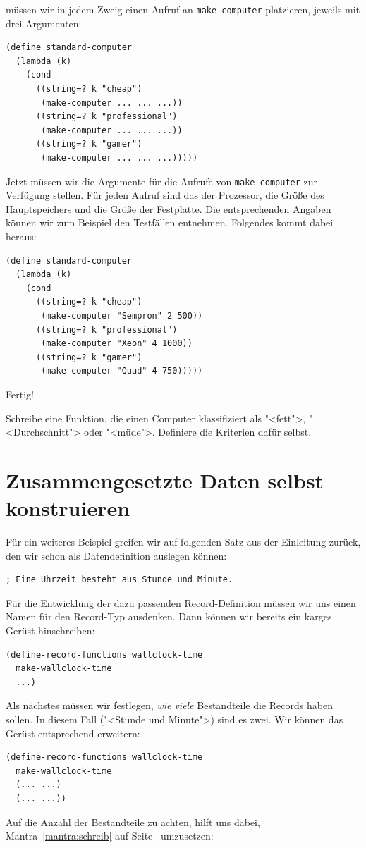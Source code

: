 müssen wir in jedem Zweig einen Aufruf an \texttt{make-computer}
platzieren, jeweils mit drei Argumenten:
%
\begin{verbatim}
(define standard-computer
  (lambda (k)
    (cond
      ((string=? k "cheap")
       (make-computer ... ... ...))
      ((string=? k "professional")
       (make-computer ... ... ...))
      ((string=? k "gamer")
       (make-computer ... ... ...)))))
\end{verbatim}
%
Jetzt müssen wir die Argumente für die Aufrufe von
\texttt{make-computer} zur Verfügung stellen.  Für jeden Aufruf sind
das der Prozessor, die Größe des Hauptspeichers und die
Größe der Festplatte.  Die entsprechenden Angaben können wir zum
Beispiel den Testfällen entnehmen.  Folgendes kommt dabei heraus:
%
\begin{verbatim}
(define standard-computer
  (lambda (k)
    (cond
      ((string=? k "cheap")
       (make-computer "Sempron" 2 500))
      ((string=? k "professional")
       (make-computer "Xeon" 4 1000))
      ((string=? k "gamer")
       (make-computer "Quad" 4 750)))))
\end{verbatim}
%
Fertig!

\begin{aufgabeinline}
  Schreibe eine Funktion, die einen Computer klassifiziert als
  "<fett">, "<Durchschnitt"> oder "<müde">.  Definiere die Kriterien
  dafür selbst.
\end{aufgabeinline}

\section{Zusammengesetzte Daten selbst konstruieren}

Für ein weiteres Beispiel greifen wir auf folgenden Satz aus der
Einleitung zurück, den wir schon als Datendefinition auslegen können:
%
\begin{verbatim}
; Eine Uhrzeit besteht aus Stunde und Minute.
\end{verbatim}
%
Für die Entwicklung der dazu passenden Record-Definition müssen wir
uns einen Namen für den Record-Typ ausdenken.  Dann können wir bereits
ein karges Gerüst hinschreiben:
%
\begin{verbatim}
(define-record-functions wallclock-time
  make-wallclock-time
  ...)
\end{verbatim}
%
Als nächstes müssen wir festlegen, \emph{wie viele} Bestandteile die
Records haben sollen.  In diesem Fall ("<Stunde und Minute">) sind es
zwei.  Wir können das Gerüst entsprechend erweitern:
%
\begin{verbatim}
(define-record-functions wallclock-time
  make-wallclock-time
  (... ...)
  (... ...))
\end{verbatim}
%
Auf die Anzahl der Bestandteile zu achten, hilft uns dabei, 
Mantra~\ref{mantra:schreib} auf Seite~\pageref{mantra:schreib}
umzusetzen:

